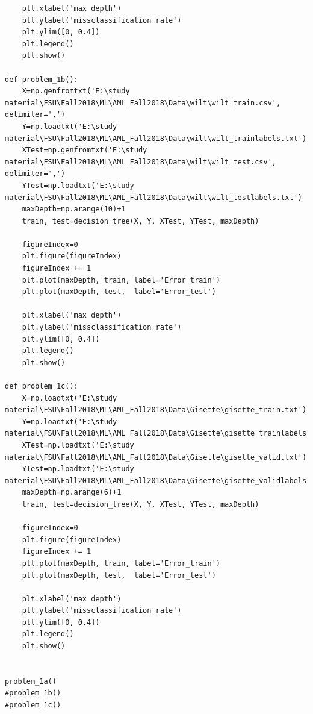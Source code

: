 \documentclass[a4paper]{article}
\begin{document}
\begin{verbatim}
    plt.xlabel('max depth')
    plt.ylabel('missclassification rate')
    plt.ylim([0, 0.4])
    plt.legend()
    plt.show()

def problem_1b():
    X=np.genfromtxt('E:\study material\FSU\Fall2018\ML\AML_Fall2018\Data\wilt\wilt_train.csv', delimiter=',')
    Y=np.loadtxt('E:\study material\FSU\Fall2018\ML\AML_Fall2018\Data\wilt\wilt_trainlabels.txt')
    XTest=np.genfromtxt('E:\study material\FSU\Fall2018\ML\AML_Fall2018\Data\wilt\wilt_test.csv', delimiter=',')
    YTest=np.loadtxt('E:\study material\FSU\Fall2018\ML\AML_Fall2018\Data\wilt\wilt_testlabels.txt')
    maxDepth=np.arange(10)+1
    train, test=decision_tree(X, Y, XTest, YTest, maxDepth)
    
    figureIndex=0
    plt.figure(figureIndex)
    figureIndex += 1
    plt.plot(maxDepth, train, label='Error_train')
    plt.plot(maxDepth, test,  label='Error_test')

    plt.xlabel('max depth')
    plt.ylabel('missclassification rate')
    plt.ylim([0, 0.4])
    plt.legend()
    plt.show()
    
def problem_1c():
    X=np.loadtxt('E:\study material\FSU\Fall2018\ML\AML_Fall2018\Data\Gisette\gisette_train.txt')
    Y=np.loadtxt('E:\study material\FSU\Fall2018\ML\AML_Fall2018\Data\Gisette\gisette_trainlabels.txt')
    XTest=np.loadtxt('E:\study material\FSU\Fall2018\ML\AML_Fall2018\Data\Gisette\gisette_valid.txt')
    YTest=np.loadtxt('E:\study material\FSU\Fall2018\ML\AML_Fall2018\Data\Gisette\gisette_validlabels.txt')
    maxDepth=np.arange(6)+1
    train, test=decision_tree(X, Y, XTest, YTest, maxDepth)
    
    figureIndex=0
    plt.figure(figureIndex)
    figureIndex += 1
    plt.plot(maxDepth, train, label='Error_train')
    plt.plot(maxDepth, test,  label='Error_test')

    plt.xlabel('max depth')
    plt.ylabel('missclassification rate')
    plt.ylim([0, 0.4])
    plt.legend()
    plt.show()
    

problem_1a()
#problem_1b()
#problem_1c()
\end{verbatim}
\bigskip

\end{document}
